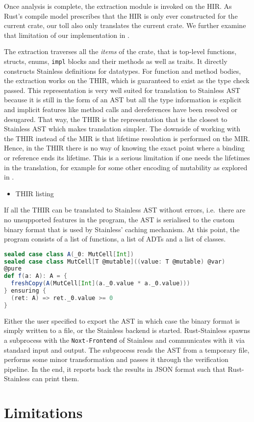 Once analysis is complete, the extraction module is invoked on the HIR.
As Rust's compile model prescribes that the HIR is only ever constructed
for the current crate, our toll also only translates the current crate.
We further examine that limitation of our implementation in .

The extraction traverses all the \emph{items} of the crate, that is
top-level functions, structs, enums, \passthrough{\lstinline!impl!}
blocks and their methods as well as traits. It directly constructs
Stainless definitions for datatypes. For function and method bodies, the
extraction works on the THIR, which is guaranteed to exist as the type
check passed. This representation is very well suited for translation to
Stainless AST because it is still in the form of an AST but all the type
information is explicit and implicit features like method calls and
dereferences have been resolved or desugared. That way, the THIR is the
representation that is the closest to Stainless AST which makes
translation simpler. The downside of working with the THIR instead of
the MIR is that lifetime resolution is performed on the MIR. Hence, in
the THIR there is no way of knowing the exact point where a binding or
reference ends its lifetime. This is a serious limitation if one needs
the lifetimes in the translation, for example for some other encoding of
mutability as explored in .

\begin{itemize}
\tightlist
\item
  THIR listing
\end{itemize}

If all the THIR can be translated to Stainless AST without errors,
i.e.~there are no unsupported features in the program, the AST is
serialised to the custom binary format that is used by Stainless'
caching mechanism. At this point, the program consists of a list of
functions, a list of ADTs and a list of classes.

\begin{lstlisting}[language=Scala]
sealed case class A(_0: MutCell[Int])
sealed case class MutCell[T @mutable]((value: T @mutable) @var)
@pure
def f(a: A): A = {
  freshCopy(A(MutCell[Int](a._0.value * a._0.value)))
} ensuring {
  (ret: A) => ret._0.value >= 0
}
\end{lstlisting}

Either the user specified to export the AST in which case the binary
format is simply written to a file, or the Stainless backend is started.
Rust-Stainless spawns a subprocess with the
\passthrough{\lstinline!Noxt-Frontend!} of Stainless and communicates
with it via standard input and output. The subprocess reads the AST from
a temporary file, performs some minor transformation and passes it
through the verification pipeline. In the end, it reports back the
results in JSON format such that Rust-Stainless can print them.

\section{Limitations}
\label{impl-limitations}
